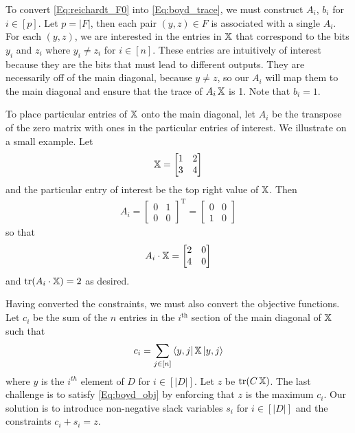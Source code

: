 To convert \cref{Eq:reichardt_F0} into \cref{Eq:boyd_trace},
we must construct $A_i$, $b_i$ for $i \in [p]$.
Let $p = |F|$, then each pair $(y,z) \in F$
is associated with a single $A_i$.
For each $(y,z)$, we are interested in the entries
in $\operatorname{\mathbb{X}}$ that correspond to the bits $y_i$ and $z_i$
where $y_i \neq z_i$ for $i \in [n]$. These entries are intuitively of interest because they are the bits that must lead to different outputs.
They are necessarily off of the main diagonal,
because $y\neq z$,
so our $A_i$ will map them to the main diagonal 
and ensure that the trace of $A_i \operatorname{\mathbb{X}}$ is 1.
Note that $b_i = 1$.

To place particular entries of $\operatorname{\mathbb{X}}$ onto the main diagonal,
let $A_i$ be the transpose of the zero matrix with
ones in the particular entries of interest.
We illustrate on a small example.
Let
\begin{align}
    \operatorname{\mathbb{X}} = \left[ \begin{matrix} 1 & 2 \\ 3 & 4 \end{matrix} \right] \nonumber
\end{align}
and the particular entry of interest be the top right value of $\operatorname{\mathbb{X}}$.
Then
\begin{align}
    A_i = \left[ \begin{matrix} 0 & 1 \\ 0 & 0 \end{matrix} \right]^\textrm{T} \nonumber
    = \left[ \begin{matrix} 0 & 0 \\ 1 & 0 \end{matrix} \right] \nonumber
\end{align}
so that
\begin{align}
    A_i \cdot \operatorname{\mathbb{X}} = \left[ \begin{matrix} 2 & 0 \\ 4 & 0 \end{matrix} \right] \nonumber
\end{align}
and $\operatorname{\text{tr}}(A_i \cdot \operatorname{\mathbb{X}}) = 2$ as desired.

Having converted the constraints, we must also convert the objective functions. Let $c_i$ be the sum of the $n$ entries
in the $i^\mathrm{th}$ section of the main diagonal of $\operatorname{\mathbb{X}}$
such that
\begin{align}
    c_i = \sum_{j \in [n]} \bra{y,j}\operatorname{\mathbb{X}}\ket{y,j}
    \nonumber
\end{align} 
where $y$ is the $i^{th}$ element of $D$ for
$i \in [|D|]$.
Let $z$ be $\operatorname{\text{tr}}(C\operatorname{\mathbb{X}})$.
The last challenge is to satisfy \cref{Eq:boyd_obj}
by enforcing that $z$ is the maximum $c_i$.
Our solution is to introduce non-negative slack variables
$s_i$ for $i \in [|D|]$ and the constraints
$c_i + s_i = z$.

